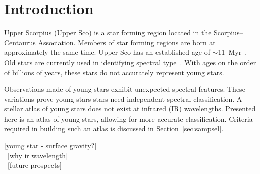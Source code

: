 \section{Introduction}
  



  
  
Upper Scorpius (Upper Sco) is a star forming region located in 
the Scorpius–Centaurus Association.  Members of star forming regions 
are born at approximately the same time.  Upper Sco has an established age 
of $\sim$11~Myr~\cite{Pecaut_2012}.  Old stars are currently used in 
identifying spectral type~\cite{Rayner_2009, Ivanov_2004}.  With ages on 
the order of billions of years, these stars do not accurately represent 
young stars.



Observations made of young stars exhibit unexpected 
spectral features.  These variations prove young stars 
stars need independent spectral classification.  A stellar 
atlas of young stars does not exist at infrared (IR) wavelengths.
Presented here is an atlas of young stars, allowing for 
more accurate classification.  Criteria required in building such 
an atlas is discussed in Section~\ref{sec:sampsel}.



\iffalse
[Need to add introduction to Upper Sco here.]\\
~[start at same level as UROP - difference between old and young stars]\\
~[why do we need young atlas]\\
\fi
[young star - surface gravity?]\\
~[why ir wavelength]\\
~[future prospects]